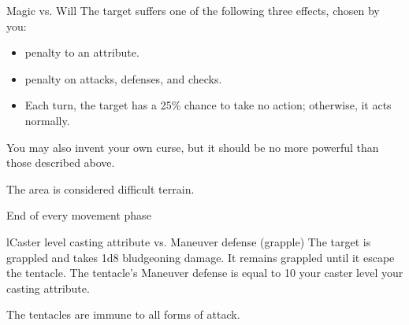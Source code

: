 \begin{spellheader}
    \spellrng{\rngclose}
\end{spellheader}
\begin{spelleffects}
    \begin{spellattack}{Magic vs. Will}
        \spellsuccess The target suffers one of the following three effects, chosen by you:
        \begin{itemize}
            \item {} penalty to an attribute.
            \item {} penalty on attacks, defenses, and checks.
            \item Each turn, the target has a 25\% chance to take no action; otherwise, it acts normally.
        \end{itemize}
        \par You may also invent your own curse, but it should be no more powerful than those described above.
    \end{spellattack}
\end{spelleffects}
\begin{spellfooter}
    \spellnotes \cursespellnotes
\end{spellfooter}

\begin{spellheader}
    \spelldur{\durshort \dismissable}
\end{spellheader}
\begin{spelleffects}
    \spelleffect The area is considered difficult terrain.
    \begin{spelltrigger}{End of every movement phase}
        \begin{spellattack}l{Caster level \add casting attribute vs. Maneuver defense (grapple)}
            \spellsuccess The target is grappled and takes 1d8 bludgeoning damage. It remains grappled until it escape the tentacle. The tentacle's Maneuver defense is equal to 10 \add your caster level \add your casting attribute.
        \end{spellattack}
    \end{spelltrigger}
\end{spelleffects}
\begin{spellfooter}
    \spellnotes The tentacles are immune to all forms of attack.
\end{spellfooter}

